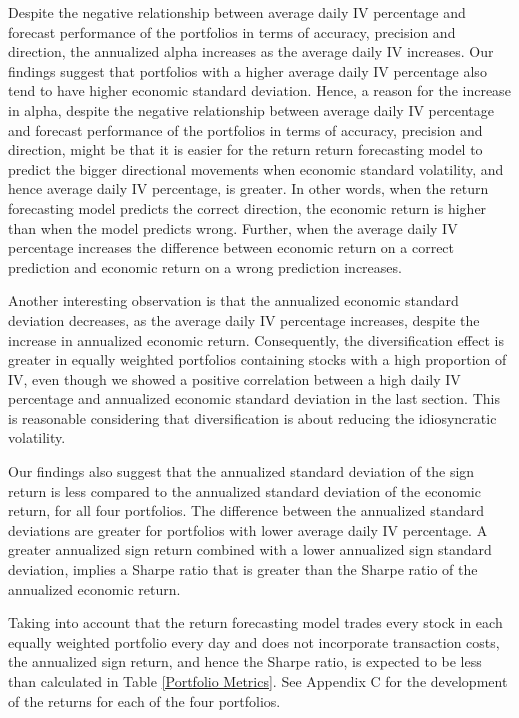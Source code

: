 Despite the negative relationship between average daily IV percentage and forecast performance of the portfolios in terms of accuracy, precision and direction, the annualized alpha increases as the average daily IV increases. Our findings suggest that portfolios with a higher average daily IV percentage also tend to have higher economic standard deviation. Hence, a reason for the increase in alpha, despite the negative relationship between average daily IV percentage and forecast performance of the portfolios in terms of accuracy, precision and direction, might be that it is easier for the return return forecasting model to predict the bigger directional movements when economic standard volatility, and hence average daily IV percentage, is greater. In other words, when the return forecasting model predicts the correct direction, the economic return is higher than when the model predicts wrong. Further, when the average daily IV percentage increases the difference between economic return on a correct prediction and economic return on a wrong prediction increases.

Another interesting observation is that the annualized economic standard deviation decreases, as the average daily IV percentage increases, despite the increase in annualized economic return. Consequently, the diversification effect is greater in equally weighted portfolios containing stocks with a high proportion of IV, even though we showed a positive correlation between a high daily IV percentage and annualized economic standard deviation in the last section. This is reasonable considering that diversification is about reducing the idiosyncratic volatility.

Our findings also suggest that the annualized standard deviation of the sign return is less compared to the annualized standard deviation of the economic return, for all four portfolios. The difference between the annualized standard deviations are greater for portfolios with lower average daily IV percentage. A greater annualized sign return combined with a lower annualized sign standard deviation, implies a Sharpe ratio that is greater than the Sharpe ratio of the annualized economic return. 

Taking into account that the return forecasting model trades every stock in each equally weighted portfolio every day and does not incorporate transaction costs, the annualized sign return, and hence the Sharpe ratio, is expected to be less than calculated in Table \ref{Portfolio Metrics}. See Appendix C for the development of the returns for each of the four portfolios. 

